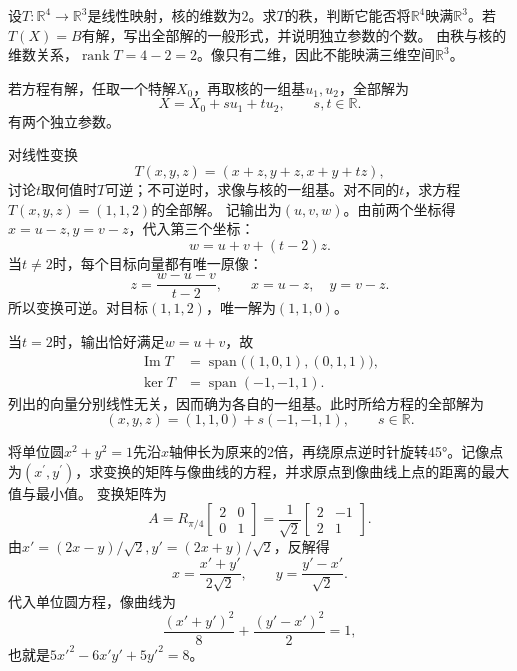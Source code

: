 设\(T : \mathbb{R}^{4} \longrightarrow \mathbb{R}^{3}\)是线性映射，核的维数为\(2\)。求\(T\)的秩，判断它能否将\(\mathbb{R}^{4}\)映满\(\mathbb{R}^{3}\)。若\(T \left( X \right) = B\)有解，写出全部解的一般形式，并说明独立参数的个数。
\solutionanswer
由秩与核的维数关系，\(\operatorname{rank}T=4-2=2\)。像只有二维，因此不能映满三维空间\(\mathbb R^3\)。

若方程有解，任取一个特解\(X_0\)，再取核的一组基\(u_1,u_2\)，全部解为
\[
X=X_0+s u_1+t u_2,\qquad s,t\in\mathbb R.
\]
有两个独立参数。


对线性变换
\begin{equation*}
    T \left( x , y , z \right) = \left( x + z , y + z , x + y + t z \right) ,
\end{equation*}
讨论\(t\)取何值时\(T\)可逆；不可逆时，求像与核的一组基。对不同的\(t\)，求方程\(T \left( x , y , z \right) = \left( 1 , 1 , 2 \right)\)的全部解。
\solutionanswer
记输出为\((u,v,w)\)。由前两个坐标得\(x=u-z,y=v-z\)，代入第三个坐标：
\[
w=u+v+(t-2)z.
\]
当\(t\ne2\)时，每个目标向量都有唯一原像：
\[
z=\frac{w-u-v}{t-2},\qquad x=u-z,\quad y=v-z.
\]
所以变换可逆。对目标\((1,1,2)\)，唯一解为\((1,1,0)\)。

当\(t=2\)时，输出恰好满足\(w=u+v\)，故
\[
\begin{aligned}
\operatorname{Im}T&=\operatorname{span}\bigl((1,0,1),(0,1,1)\bigr),\\
\ker T&=\operatorname{span}(-1,-1,1).
\end{aligned}
\]
列出的向量分别线性无关，因而确为各自的一组基。此时所给方程的全部解为
\[
(x,y,z)=(1,1,0)+s(-1,-1,1),\qquad s\in\mathbb R.
\]


将单位圆\(x^{2} + y^{2} = 1\)先沿\(x\)轴伸长为原来的\(2\)倍，再绕原点逆时针旋转45°。记像点为\(\left( x^{\prime} , y^{\prime} \right)\)，求变换的矩阵与像曲线的方程，并求原点到像曲线上点的距离的最大值与最小值。
\solutionanswer
变换矩阵为
\[
A=R_{\pi/4}\begin{bmatrix}2&0\\0&1\end{bmatrix}
=\frac1{\sqrt2}\begin{bmatrix}2&-1\\2&1\end{bmatrix}.
\]
由\(x'=(2x-y)/\sqrt2,y'=(2x+y)/\sqrt2\)，反解得
\[
x=\frac{x'+y'}{2\sqrt2},\qquad y=\frac{y'-x'}{\sqrt2}.
\]
代入单位圆方程，像曲线为
\[
\frac{(x'+y')^2}{8}+\frac{(y'-x')^2}{2}=1,
\]
也就是\(5x'^2-6x'y'+5y'^2=8\)。

